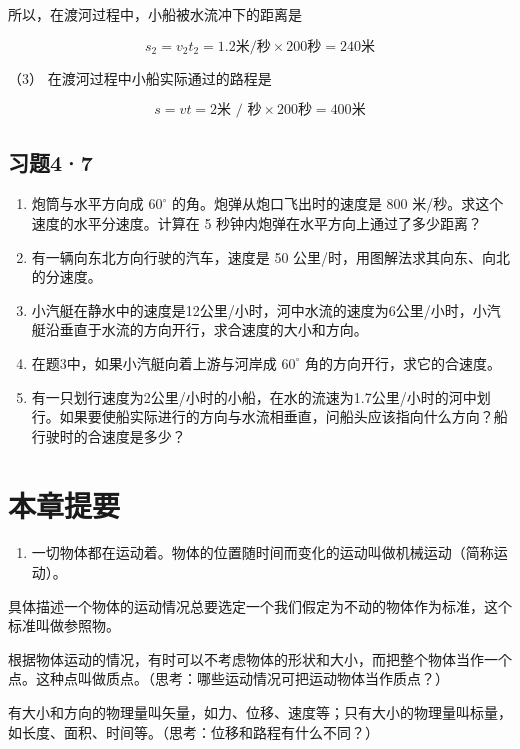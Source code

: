 所以，在渡河过程中，小船被水流冲下的距离是

\[
s _ {2} = v _ {2} t _ {2} = 1.2 \text{米/秒} \times 200 \text{秒} = 240 \text{米}
\]

（3） 在渡河过程中小船实际通过的路程是

\[
s = v t = 2 \text{米 / 秒} \times 200 \text{秒} = 400 \text{米}
\]

\subsection{习题4·7}\label{ux4e60ux989847}

\begin{enumerate}
\def\labelenumi{\arabic{enumi}.}
\item
  炮筒与水平方向成 \(60^{\circ}\) 的角。炮弹从炮口飞出时的速度是 800
  米/秒。求这个速度的水平分速度。计算在 5
  秒钟内炮弹在水平方向上通过了多少距离？
\item
  有一辆向东北方向行驶的汽车，速度是 50
  公里/时，用图解法求其向东、向北的分速度。
\item
  小汽艇在静水中的速度是12公里/小时，河中水流的速度为6公里/小时，小汽艇沿垂直于水流的方向开行，求合速度的大小和方向。
\item
  在题3中，如果小汽艇向着上游与河岸成 \(60^{\circ}\)
  角的方向开行，求它的合速度。
\item
  有一只划行速度为2公里/小时的小船，在水的流速为1.7公里/小时的河中划行。如果要使船实际进行的方向与水流相垂直，问船头应该指向什么方向？船行驶时的合速度是多少？
\end{enumerate}

\section{本章提要}\label{ux672cux7ae0ux63d0ux8981-3}

\begin{enumerate}
\def\labelenumi{\arabic{enumi}.}
\tightlist
\item
  一切物体都在运动着。物体的位置随时间而变化的运动叫做机械运动（简称运动）。
\end{enumerate}

具体描述一个物体的运动情况总要选定一个我们假定为不动的物体作为标准，这个标准叫做参照物。

根据物体运动的情况，有时可以不考虑物体的形状和大小，而把整个物体当作一个点。这种点叫做质点。（思考：哪些运动情况可把运动物体当作质点？）

有大小和方向的物理量叫矢量，如力、位移、速度等；只有大小的物理量叫标量，如长度、面积、时间等。（思考：位移和路程有什么不同？）

